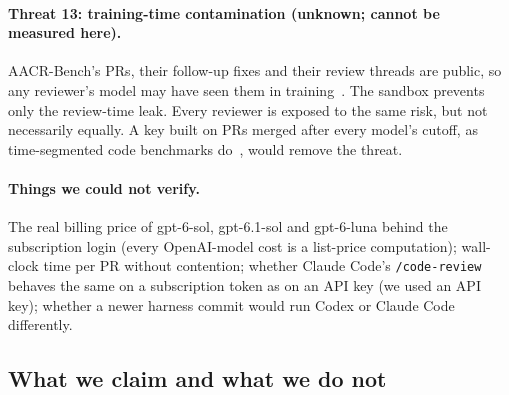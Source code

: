 \documentclass[11pt,a4paper]{article}
\newcommand{\code}[1]{\texttt{#1}}
\begin{document}
\paragraph{Threat 13: training-time contamination (unknown; cannot be measured here).}
AACR-Bench's PRs, their follow-up fixes and their review threads are public,
so any reviewer's model may have seen them in
training~\cite{sainz2023,riddell2024}. The sandbox prevents only the
review-time leak. Every reviewer is exposed to the same risk, but not
necessarily equally. A key built on PRs merged after every model's cutoff, as
time-segmented code benchmarks do~\cite{jain2025livecodebench,zhang2025swebenchlive},
would remove the threat.

\paragraph{Things we could not verify.} The real billing price of
gpt-6-sol, gpt-6.1-sol and gpt-6-luna behind the subscription login (every
OpenAI-model cost is a list-price computation); wall-clock time per PR
without contention; whether Claude Code's \code{/code-review} behaves the
same on a subscription token as on an API key (we used an API key); whether a
newer harness commit would run Codex or Claude Code differently.

\subsection{What we claim and what we do not}
\end{document}
